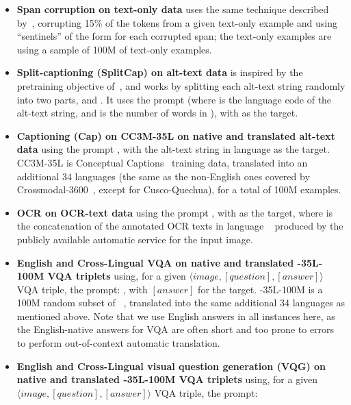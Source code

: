 \begin{itemize}
    \item \textbf{Span corruption on text-only data} uses the same technique described by~\citet{xue-2021-mt5}, corrupting 15\% of the tokens from a given text-only example and using ``sentinels'' of the form \exidk for each corrupted span; the text-only examples are using a sample of 100M of text-only examples.
    \item \textbf{Split-captioning (SplitCap) on \PTDATA alt-text data} is inspired by the pretraining objective of~\citet{simvlm}, and works by splitting each alt-text string randomly into two parts, \capfirst and \capsecond. It uses the prompt  (where \lang is the language code of the alt-text string, and \pos is the number of words in \capfirst), with \capsecond as the target.
    \item \textbf{Captioning (Cap) on CC3M-35L on native and translated alt-text data} using the prompt , with the alt-text string in language \lang as the target. CC3M-35L is Conceptual Captions~\citep{cc3m} training data, translated into an additional 34 languages (the same as the non-English ones covered by Crossmodal-3600~\citep{xm3600}, except for Cusco-Quechua), for a total of 100M examples.
    \item \textbf{OCR on \PTDATA OCR-text data} using the prompt , with \ocrtext as the target, where \ocrtext is the concatenation of the annotated OCR texts in language \lang~\citep{prestu} produced by the publicly available automatic service for the input image. 
    \item \textbf{English and Cross-Lingual VQA on native and translated \qsqcc-35L-100M VQA triplets} using, for a
    given $\langle image, [question], [answer]\rangle$ VQA triple, the prompt: 
    , with $[answer]$ for the target.
    \qsqcc-35L-100M is a 100M random subset of \qsqcc~\citep{changpinyo-2022-vq2a}, translated into the same additional 34 languages as mentioned above.
    Note that we use English answers in all instances here, as the English-native answers for VQA are often short and too prone to errors to perform out-of-context automatic translation.
    \item \textbf{English and Cross-Lingual visual question generation (VQG) on native and translated \qsqcc-35L-100M VQA triplets} using, for a given $\langle image, [question], [answer]\rangle$ VQA triple, the prompt:

\end{itemize}
